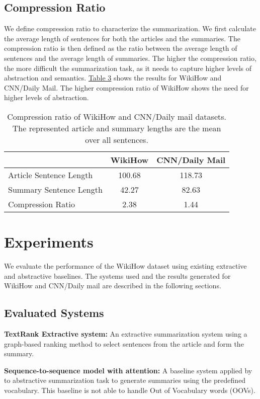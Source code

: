 \documentclass[11pt,a4paper]{article}
\begin{document}
\subsection{Compression Ratio}
We define compression ratio to characterize the summarization. We first calculate the average length of sentences for both the articles and the summaries. The compression ratio is then defined as the ratio between the average length of sentences and the average length of summaries. The higher the compression ratio, the more difficult the summarization task, as it needs to capture higher levels of abstraction and semantics. \hyperref[compression]{Table 3} shows the results for WikiHow and CNN/Daily Mail. The higher compression ratio of WikiHow shows the need for higher levels of abstraction.
\begin{table}
\footnotesize
\centering
\begin{tabular}{lcc}
&WikiHow&CNN/Daily Mail\\
\hline
Article Sentence Length&100.68&118.73\\
Summary Sentence Length&42.27&82.63\\
Compression Ratio&2.38&1.44\\
\hline
\end{tabular}
\caption{Compression ratio of WikiHow and CNN/Daily mail datasets. The represented article and summary lengths are the mean over all sentences.}
\label{compression}
\vspace*{-2mm}
\end{table}



\section{Experiments} 
We evaluate the performance of the WikiHow dataset using existing extractive and abstractive baselines. The systems used and the results generated for WikiHow and CNN/Daily mail are described in the following sections.
\subsection{Evaluated Systems}
\textbf{TextRank Extractive system:} An extractive summarization system \cite{mihalcea2004textrank,barrios2016variations} using a graph-based ranking method to select sentences from the article and form the summary.

\noindent\textbf{Sequence-to-sequence model with attention:} A baseline system applied by \citet{chopra2016abstractive,nallapati2016abstractive} to abstractive summarization task to generate summaries using the predefined vocabulary. This baseline is not able to handle Out of Vocabulary words (OOVs).
\end{document}
